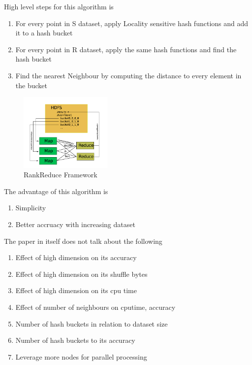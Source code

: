 \documentclass[conference]{IEEEtran}
\begin{document}
\bigskip

High level steps for this algorithm is
\begin{enumerate}
\item For every point in S dataset, apply Locality sensitive hash
  functions and add it to a hash bucket
\item For every point in R dataset, apply the same hash functions and
  find the hash bucket
\item Find the nearest Neighbour by computing the distance to every
  element in the bucket
\end{enumerate}


\begin{figure}[here]
\includegraphics[width=0.4\textwidth]{rankreduce.png}
\caption{RankReduce Framework}
\label{fig:rankreduce.png}
\end{figure}

\bigskip

The advantage of this algorithm is
\begin{enumerate}
\item Simplicity
\item Better accruacy with increasing dataset
\end{enumerate}

\bigskip

The paper in itself does not talk about the following
\begin{enumerate}
\item Effect of high dimension on its accuracy
\item Effect of high dimension on its shuffle bytes
\item Effect of high dimension on its cpu time
\item Effect of number of neighbours on cputime, accuracy
\item Number of hash buckets in relation to dataset size
\item Number of hash buckets to its accuracy
\item Leverage more nodes for parallel processing
\end{enumerate}
\end{document}
